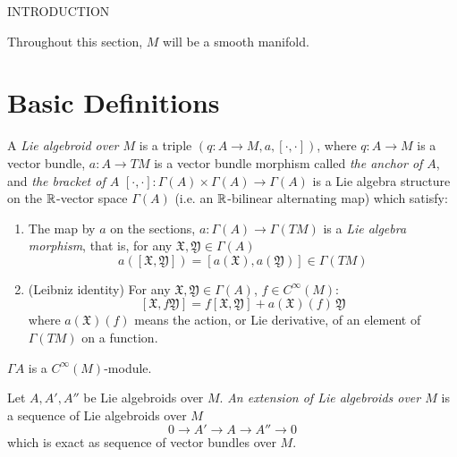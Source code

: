 INTRODUCTION


Throughout this section, $M$ will be a smooth manifold.

\section{Basic Definitions}

\begin{definition} 
A \emph{Lie algebroid over $M$} is a triple $(q:A \to M, a, [\cdot, \cdot ])$, where $q:A \to M$ is a vector bundle, $a:A \to TM$ is a vector bundle morphism called \emph{the anchor of $A$}, and \emph{the bracket of $A$} $[\cdot, \cdot ]: \Gamma(A) \times \Gamma(A) \to \Gamma(A)$ is a Lie algebra structure on the $\operatorname{\mathbb{R}}$-vector space $\Gamma(A)$ (i.e. an $\operatorname{\mathbb{R}}$-bilinear alternating map) which satisfy:

\begin{enumerate}
    \item The map by $a$ on the sections, $a:\Gamma(A) \to \Gamma(TM)$ is a \emph{Lie algebra morphism}, that is, for any $\mathfrak X, \mathfrak Y \in \Gamma(A)$ \[ a([\mathfrak X, \mathfrak Y])  = [a(\mathfrak X), a(\mathfrak Y)] \in  \Gamma(TM)\]
    
    \item (Leibniz identity) For any $\mathfrak X, \mathfrak Y \in \Gamma(A)$, $f \in C^\infty (M)$: \[ [\mathfrak X, f\mathfrak Y] = f[\mathfrak X, \mathfrak Y] + a(\mathfrak X)(f)\, \mathfrak Y \] where $a(\mathfrak X)(f)$ means the action, or Lie derivative, of an element of $\Gamma(TM)$ on a function.
\end{enumerate}
\end{definition}

$\Gamma A$ is a $C^\infty(M)$-module.

\begin{definition} 

\end{definition}

\begin{definition} 
Let $A, A', A''$ be Lie algebroids over $M$. \emph{An extension of Lie algebroids over $M$} is a sequence of Lie algebroids over $M$ \[ 0 \to A' \to A \to A'' \to 0 \] which is exact as sequence of vector bundles over $M$. 
\end{definition}
\hline

